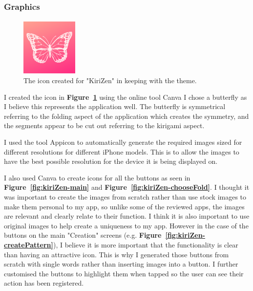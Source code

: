 \documentclass[11pt]{article}
\begin{document}
         \subsubsection{Graphics}
                \paragraph{}

        \begin{figure}
                        \centering
                        \includegraphics[width=0.25\textwidth]{KiriZen/icon.png}
                        \caption{The icon created for "KiriZen" in keeping with the theme.}
                        \label{fig:icon}
                    \end{figure}
            I created the icon in \textbf{Figure~\ref{fig:icon}} using the online tool Canva %
            I chose a butterfly as I believe this represents the application well. The butterfly is symmetrical referring to the folding aspect of the application which creates the symmetry, and the segments appear to be cut out referring to the kirigami aspect.
            
            I used the tool Appicon %
            to automatically generate the required images sized for different resolutions for different iPhone models. This is to allow the images to have the best possible resolution for the device it is being displayed on.
        
            I also used Canva to create icons for all the buttons as  seen in \textbf{Figure~\ref{fig:kiriZen-main}} and \textbf{Figure~\ref{fig:kiriZen-chooseFold}}. I thought it was important to create the images from scratch rather than use stock images to make them personal to my app, so unlike some of the reviewed apps, the images are relevant and clearly relate to their function. I think it is also important to use original images to help create a uniqueness to my app. However in the case of the buttons on the main "Creation" screens (e.g. \textbf{Figure~\ref{fig:kiriZen-createPattern}}), I believe it is more important that the functionality is clear than having an attractive icon. This is why I generated those buttons from scratch with single words rather than inserting images into a button. I further customised the buttons to highlight them when tapped so the user can see their action has been registered.
            
\end{document}
